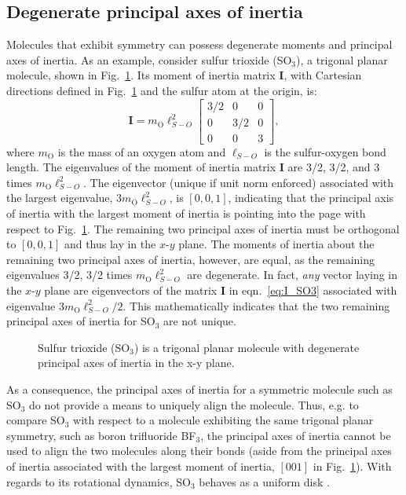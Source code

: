 \documentclass[journal=jacsat,manuscript=article]{achemso}
\begin{document}
{\color{red}
\subsection{Degenerate principal axes of inertia}
Molecules that exhibit symmetry can possess degenerate moments and principal axes of inertia. As an example, consider sulfur trioxide (SO$_3$), a trigonal planar molecule, shown in Fig.~\ref{fig:SO3}. Its moment of inertia matrix $\mathbf{I}$, with Cartesian directions defined in Fig.~\ref{fig:SO3} and the sulfur atom at the origin, is:
\begin{equation}
\mathbf{I} = m_{\text{O}} \ell_{S-O}^2
  \begin{bmatrix}
    3/2 & 0 & 0 \\
    0 & 3/2 & 0 \\
    0 & 0 & 3
  \end{bmatrix}, \label{eq:I_SO3}
\end{equation} where $m_{\text{O}}$ is the mass of an oxygen atom and $\ell_{S-O}$ is the sulfur-oxygen bond length. The eigenvalues of the moment of inertia matrix $\mathbf{I}$ are 3/2, 3/2, and 3 times $m_{\text{O}} \ell_{S-O}^2$. The eigenvector (unique if unit norm enforced) associated with the largest eigenvalue, $3 m_{\text{O}} \ell_{S-O}^2$, is $[0, 0, 1]$, indicating that the principal axis of inertia with the largest moment of inertia is pointing into the page with respect to Fig.~\ref{fig:SO3}. The remaining two principal axes of inertia must be orthogonal to $[0, 0, 1]$ and thus lay in the $x$-$y$ plane. The moments of inertia about the remaining two principal axes of inertia, however, are equal, as the remaining eigenvalues 3/2, 3/2 times $m_{\text{O}} \ell_{S-O}^2$ are degenerate. In fact, \emph{any} vector laying in the $x$-$y$ plane are eigenvectors of the matrix $\mathbf{I}$ in eqn.~\ref{eq:I_SO3} associated with eigenvalue $3m_{\text{O}} \ell_{S-O}^2/2$. This mathematically indicates that the two remaining principal axes of inertia for SO$_3$ are not unique.

\begin{figure}
\centering
	\caption{{\color{red} Sulfur trioxide (SO$_3$) is a trigonal planar molecule with degenerate principal axes of inertia in the x-y plane.
	}%
	} \label{fig:SO3}
\end{figure}

As a consequence, the principal axes of inertia for a symmetric molecule such as SO$_3$ do not provide a means to uniquely align the molecule. Thus, e.g. to compare SO$_3$ with respect to a molecule exhibiting the same trigonal planar symmetry, such as boron trifluoride BF$_3$, the principal axes of inertia cannot be used to align the two molecules along their bonds (aside from the principal axes of inertia associated with the largest moment of inertia, $[0 0 1]$ in Fig.~\ref{fig:SO3}). With regards to its rotational dynamics, SO$_3$ behaves as a uniform disk \cite{peraire2008lecture}.

}
\end{document}
